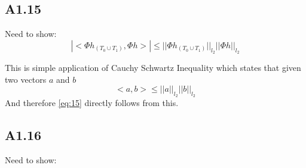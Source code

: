 \documentclass{article}
\newcommand{\ltwo}[1]{
  ||#1||_{l_2}
}
\newcommand{\htzo}{
  h_{(T_0 \cup T_1)}
}
\begin{document}
\subsection*{A1.15}
Need to show:
\begin{equation}
  \label{eq:15}
  |<\Phi\htzo,\Phi h>| \le \ltwo{\Phi\htzo}\ltwo{\Phi h}
\end{equation}

This is simple application of Cauchy Schwartz Inequality which states that given two vectors $a$ and $b$
$$<a,b> \le \ltwo{a}\ltwo{b}$$
And therefore \ref{eq:15} directly follows from this.

\subsection*{A1.16}
Need to show:
\end{document}

